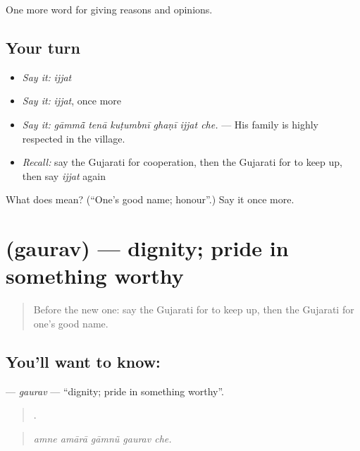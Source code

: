 \begin{grammarlens}[title={What you've built}]
One more word for giving reasons and opinions.
\end{grammarlens}

\subsection*{Your turn}
\begin{itemize}
\raggedright
  \item \emph{Say it:} \emph{ijjat}
  \item \emph{Say it:} \emph{ijjat}, once more
  \item \emph{Say it:} \emph{gāmmā̃ tenā kuṭumbnī ghaṇī ijjat che.} — His family is highly respected in the village.
  \item \emph{Recall:} say the Gujarati for cooperation, then the Gujarati for to keep up, then say \emph{ijjat} again
\end{itemize}

\begin{tcolorbox}[breakable,colback=teal!4,colframe=teal!35!black,title={Before you move on}]
What does  mean? (\textquotedblleft{}One's good name; honour\textquotedblright{}.) Say it once more.
\end{tcolorbox}
\section[\texorpdfstring{\gu{ગૌરવ} (gaurav)}{ગૌરવ (gaurav)}]{ (gaurav) — dignity; pride in something worthy}

\label{lesson:GU-C359-gaurav}



\begin{quote}
Before the new one: say the Gujarati for to keep up, then the Gujarati for one's good name.
\end{quote}

\subsection*{You'll want to know: }
\textbf{} — \emph{gaurav} — \textquotedblleft{}dignity; pride in something worthy\textquotedblright{}.

\begin{quote}
    .
\end{quote}

\begin{quote}
\emph{amne amārā gāmnũ gaurav che.}
\end{quote}

